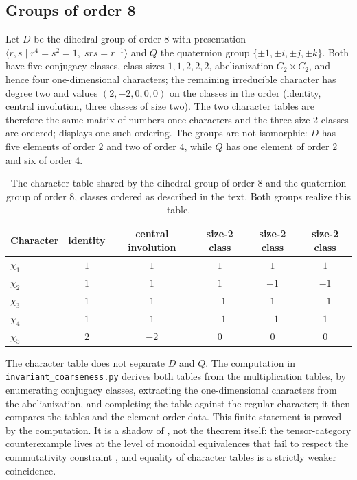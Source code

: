 \documentclass[11pt,letterpaper]{article}
\theoremstyle{definition}
\theoremstyle{remark}
\begin{document}
\subsection{Groups of order 8}

Let $D$ be the dihedral group of order 8 with presentation $\langle r, s \mid r^4 = s^2 = 1, \; s r s = r^{-1}\rangle$ and $Q$ the quaternion group $\{\pm 1, \pm i, \pm j, \pm k\}$. Both have five conjugacy classes, class sizes $1, 1, 2, 2, 2$, abelianization $C_2 \times C_2$, and hence four one-dimensional characters; the remaining irreducible character has degree two and values $(2, -2, 0, 0, 0)$ on the classes in the order (identity, central involution, three classes of size two). The two character tables are therefore the same matrix of numbers once characters and the three size-2 classes are ordered;  displays one such ordering. The groups are not isomorphic: $D$ has five elements of order $2$ and two of order $4$, while $Q$ has one element of order $2$ and six of order $4$.

\begin{table}[t]
\centering
\small
\begin{tabular}{@{} lccccc @{}}
\toprule
Character & identity & central involution & size-2 class & size-2 class & size-2 class \\
\midrule
$\chi_1$ & $1$ & $1$ & $1$ & $1$ & $1$ \\
$\chi_2$ & $1$ & $1$ & $1$ & $-1$ & $-1$ \\
$\chi_3$ & $1$ & $1$ & $-1$ & $1$ & $-1$ \\
$\chi_4$ & $1$ & $1$ & $-1$ & $-1$ & $1$ \\
$\chi_5$ & $2$ & $-2$ & $0$ & $0$ & $0$ \\
\bottomrule
\end{tabular}
\caption{The character table shared by the dihedral group of order 8 and the quaternion group of order 8, classes ordered as described in the text. Both groups realize this table.}
\label{tab:chars}
\end{table}

The character table does not separate $D$ and $Q$. The computation in \texttt{invariant\_\allowbreak coarseness.py} derives both tables from the multiplication tables, by enumerating conjugacy classes, extracting the one-dimensional characters from the abelianization, and completing the table against the regular character; it then compares the tables and the element-order data. This finite statement is proved by the computation. It is a shadow of , not the theorem itself: the tensor-category counterexample lives at the level of monoidal equivalences that fail to respect the commutativity constraint \cite{b2}, and equality of character tables is a strictly weaker coincidence.
\end{document}
